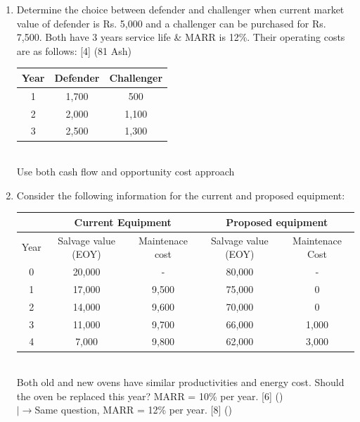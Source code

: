 \documentclass[12pt]{article}
\newcommand{\lb}{\\ $\left|\rightarrow\right.$}
\begin{document}
			\begin{enumerate}
				\item Determine the choice between defender and challenger when current market value of defender is Rs. 5,000 and a challenger can be purchased for Rs. 7,500. Both have 3 years service life \& MARR is 12\%. Their operating costs are as follows: \hfill [4] (81 Ash)\\
				\begin{tabular}{|c|c|c|}
					\hline
					Year & Defender & Challenger \\ \hline
					1 & 1,700 & 500 \\ \hline
					2 & 2,000 & 1,100 \\ \hline
					3 & 2,500 & 1,300 \\ \hline
				\end{tabular}\\
				Use both cash flow and opportunity cost approach

				\item Consider the following information for the current and proposed equipment:\\
				\begin{tabular}{|c|c|c|c|c|}
					\hline
					& \multicolumn{2}{|c|}{Current Equipment} & \multicolumn{2}{|c|}{Proposed equipment} \\ \hline
					Year & Salvage value (EOY) & Maintenace cost & Salvage value (EOY) & Maintenace Cost \\ \hline
					0 & 20,000 & - & 80,000 & - \\ \hline
					1 & 17,000 & 9,500 & 75,000 & 0 \\ \hline
					2 & 14,000 & 9,600 & 70,000 & 0 \\ \hline
					3 & 11,000 & 9,700 & 66,000 & 1,000 \\ \hline
					4 & 7,000 & 9,800 & 62,000 & 3,000 \\ \hline
				\end{tabular}\\
				Both old and new ovens have similar productivities and energy cost. Should the oven be replaced this year? MARR = 10\% per year. \hfill [6] ()
				\lb Same question, MARR = 12\% per year. \hfill [8] ()


\end{enumerate}
\end{document}
